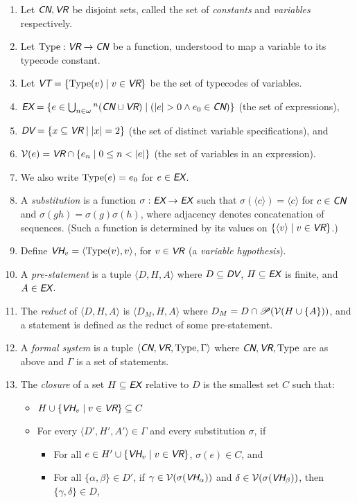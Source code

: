 \documentclass[runningheads,a4paper]{llncs}
\newcommand{\cn}{\textit{\textsf{CN}}} %
\newcommand{\vr}{\textit{\textsf{VR}}} %
\newcommand{\ex}{\textit{\textsf{EX}}} %
\newcommand{\dv}{\textit{\textsf{DV}}} %
\newcommand{\vh}{\textit{\textsf{VH}}} %
\newcommand{\vt}{\textit{\textsf{VT}}} %
\newcommand{\ang}[1]{\langle#1\rangle}
\newcommand{\type}{{\rm Type}}
\newcommand{\pow}[1]{\mathscr{P}(#1)}
\begin{document}
\begin{enumerate}
  \item Let $\cn,\vr$ be disjoint sets, called the set of {\em constants} and {\em variables} respectively.
  \item Let $\type:\vr\to\cn$ be a function, understood to map a variable to its typecode constant.
  \item Let $\vt=\{\type(v)\mid v\in\vr\}$ be the set of typecodes of variables.
  \item $\ex=\{e\in\bigcup_{n\in\omega}{}^n(\cn\cup \vr)\mid(|e|>0 \wedge e_0\in\cn)\}$ (the set of expressions), 
  \item $\dv=\{x\subseteq\vr\mid|x|=2\}$ (the set of distinct variable specifications), and
  \item ${\cal V}(e)=\vr\cap\{e_n\mid 0\le n<|e|\}$ (the set of variables in an expression).
  \item We also write $\type(e)=e_0$ for $e\in\ex$.
  \item\label{def:subst} A {\em substitution} is a function $\sigma:\ex\to\ex$ such that $\sigma(\ang{c})=\ang{c}$ for $c\in\cn$ and $\sigma(gh)=\sigma(g)\sigma(h)$, where adjacency denotes concatenation of sequences. (Such a function is determined by its values on $\{\ang{v}\mid v\in\vr\}$.)
  \item Define $\vh_v=\ang{\type(v), v}$, for $v\in\vr$ (a {\em variable hypothesis}).
  \item A {\em pre-statement} is a tuple $\ang{D,H,A}$ where $D\subseteq\dv$, $H\subseteq\ex$ is finite, and $A\in\ex$.
  \item The {\em reduct} of $\ang{D,H,A}$ is $\ang{D_M,H,A}$ where $D_M=D\cap\pow{{\cal V}(H\cup\{A\})}$, and a statement is defined as the reduct of some pre-statement.
  \item A {\em formal system} is a tuple $\ang{\cn,\vr,\type,\Gamma}$ where $\cn,\vr,\type$ are as above and $\Gamma$ is a set of statements.
  \item\label{def:cls} The {\em closure} of a set $H\subseteq\ex$ relative to $D$ is the smallest set $C$ such that:
  \begin{itemize}
    \item $H\cup\{\vh_v\mid v\in\vr\}\subseteq C$
    \item For every $\ang{D',H',A'}\in\Gamma$ and every substitution $\sigma$, if
    \begin{itemize}
      \item For all $e\in H'\cup\{\vh_v\mid v\in\vr\}$, $\sigma(e)\in C$, and
      \item For all $\{\alpha,\beta\}\in D'$, if $\gamma\in{\cal V}(\sigma(\vh_\alpha))$ and $\delta\in{\cal V}(\sigma(\vh_\beta))$, then $\{\gamma,\delta\}\in D$,

\end{itemize}
\end{itemize}
\end{enumerate}
\end{document}
